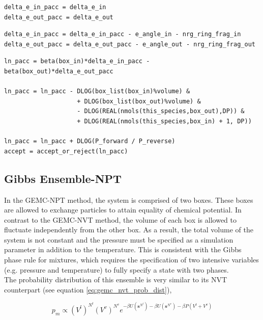 \begin{minipage}{\linewidth}
\begin{lstlisting}[firstnumber=505, caption=gemc\_particle\_transfer.f90]
delta_e_in_pacc = delta_e_in
delta_e_out_pacc = delta_e_out
\end{lstlisting}

\begin{lstlisting}[firstnumber=518]
delta_e_in_pacc = delta_e_in_pacc - e_angle_in - nrg_ring_frag_in
delta_e_out_pacc = delta_e_out_pacc - e_angle_out - nrg_ring_frag_out
\end{lstlisting}


\begin{lstlisting}[firstnumber=526]
ln_pacc = beta(box_in)*delta_e_in_pacc - beta(box_out)*delta_e_out_pacc

ln_pacc = ln_pacc - DLOG(box_list(box_in)%volume) &
                    + DLOG(box_list(box_out)%volume) &
                    - DLOG(REAL(nmols(this_species,box_out),DP)) &
                    + DLOG(REAL(nmols(this_species,box_in) + 1, DP))

ln_pacc = ln_pacc + DLOG(P_forward / P_reverse)
accept = accept_or_reject(ln_pacc)
\end{lstlisting}
\end{minipage}


\subsection{Gibbs Ensemble-NPT} 
\label{sec:gibbs_npt}

In the GEMC-NPT method, the system is comprised of two boxes. These boxes are allowed to exchange
particles to attain equality of chemical potential. In contrast to
the GEMC-NVT method, the volume of each box is allowed to fluctuate
independently from the other box. As a result, the total volume of the system is not constant and the 
pressure must be specified as a simulation parameter in addition to the temperature.
This is consistent with the Gibbs phase rule for mixtures, which requires the specification of two intensive
variables (e.g. pressure and temperature) to fully specify a state with two phases. \\

The probability distribution of this ensemble is very similar to its NVT counterpart (see
equation \ref{eq:gemc_nvt_prob_dist}), 

\begin{equation}
p_m \propto (V^l)^{N^l} (V^v)^{N^v} e^{-\beta U \left(\textbf{s}^{N^l}\right) -\beta U \left(\textbf{s}^{N^v}\right)
- \beta P \left(V^l + V^v\right) }
\label{eq:gemc_npt_prob_dist}
\end{equation}

